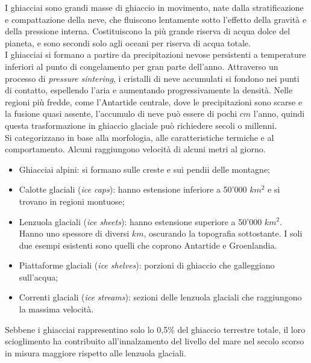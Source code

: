 \documentclass[a4paper,12pt]{book}
\begin{document}
I ghiacciai sono grandi masse di ghiaccio in movimento, nate dalla stratificazione e compattazione della neve, che fluiscono lentamente sotto l'effetto della gravità e della pressione interna.
Costituiscono la più grande riserva di acqua dolce del pianeta, e sono secondi solo agli oceani per riserva di acqua totale.\\

\noindent
I ghiacciai si formano a partire da precipitazioni nevose persistenti a temperature inferiori al punto di congelamento per gran parte dell'anno.
Attraverso un processo di \textit{pressure sintering}, i cristalli di neve accumulati si fondono nei punti di contatto, espellendo l'aria e aumentando progressivamente la densità.
Nelle regioni più fredde, come l'Antartide centrale, dove le precipitazioni sono scarse e la fusione quasi assente,
l'accumulo di neve può essere di pochi $cm$ l'anno, quindi questa trasformazione in ghiaccio glaciale può richiedere secoli o millenni.\\

\noindent
Si categorizzano in base alla morfologia, alle caratteristiche termiche e al comportamento.
Alcuni raggiungono velocità di alcuni metri al giorno.

\begin{itemize}
    \item Ghiacciai alpini: si formano sulle creste e sui pendii delle montagne;
    \item Calotte glaciali (\textit{ice caps}): hanno estensione inferiore a 50'000 $km^2$ e si trovano in regioni montuose;
    \item Lenzuola glaciali (\textit{ice sheets}): hanno estensione superiore a 50'000 $km^2$.
    Hanno uno spessore di diversi $km$, oscurando la topografia sottostante. I soli due esempi esistenti sono quelli che coprono Antartide e Groenlandia.
    \item Piattaforme glaciali (\textit{ice shelves}): porzioni di ghiaccio che galleggiano sull'acqua;
    \item Correnti glaciali (\textit{ice streams}): sezioni delle lenzuola glaciali che raggiungono la massima velocità.
\end{itemize}

\noindent
Sebbene i ghiacciai rappresentino solo lo 0,5\% del ghiaccio terrestre totale, il loro scioglimento ha contribuito all'innalzamento del livello del mare nel secolo scorso in misura maggiore rispetto alle lenzuola glaciali.\\
\end{document}
